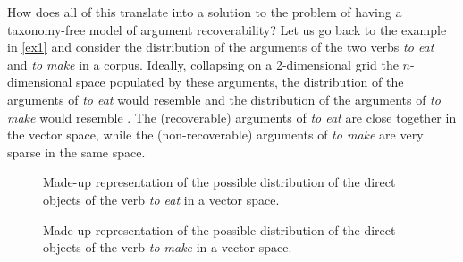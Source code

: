 How does all of this translate into a solution to the problem of having a taxonomy-free model of argument recoverability? Let us go back to the example in \ref{ex1} and consider the distribution of the arguments of the two verbs \textit{to eat} and \textit{to make} in a corpus. Ideally, collapsing on a 2-dimensional grid the $n$-dimensional space populated by these arguments, the distribution of the arguments of \textit{to eat} would resemble  and the distribution of the arguments of \textit{to make} would resemble . The (recoverable) arguments of \textit{to eat} are close together in the vector space, while the (non-recoverable) arguments of \textit{to make} are very sparse in the same space.

\begin{figure}[htb]
\caption{Made-up representation of the possible distribution of the direct objects of the verb \textit{to eat} in a vector space.}
\centering
{}
\end{figure}

\begin{figure}[htb]
\caption{Made-up representation of the possible distribution of the direct objects of the verb \textit{to make} in a vector space.}
\centering
{}
\end{figure}

